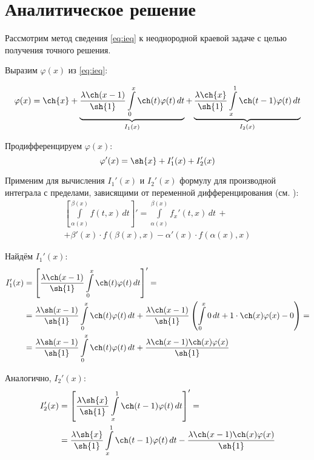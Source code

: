 \documentclass{article}
\numberwithin{equation}{section}
\renewcommand{\phi}{\varphi}
\newcommand{\intl}{\int\limits}
\begin{document}
\clearpage
\section{Аналитическое решение}
\label{sec:anal-solution}

Рассмотрим метод сведения \eqref{eq:ieq} к неоднородной краевой задаче
с целью получения точного решения.

Выразим $\phi(x)$ из \eqref{eq:ieq}:

\begin{equation}
  \label{eq:phi}
  \phi(x) = \ch{x} + 
  \underbrace{\frac{\lambda \ch(x-1)}{\sh{1}}\intl_0^x{\ch(t) \phi(t)\,dt}}_{I_1(x)} +
  \underbrace{\frac{\lambda \ch{x}}{\sh{1}}\intl_x^1{\ch(t-1)\phi(t)\,dt}}_{I_2(x)}
\end{equation}

Продифференцируем $\phi(x)$:
\begin{equation*}
  \phi'(x) = \sh{x} + I_1'(x) + I_2'(x)
\end{equation*}

Применим для вычисления $I_1'(x)$ и $I_2'(x)$ формулу для производной
интеграла с пределами, зависящими от переменной дифференцирования (см.
\cite{fikhtengolz03}):
\begin{multline}\label{eq:intdiff}
  \left [ \intl_{\alpha(x)}^{\beta(x)}{f(t, x)\,dt} \right ] ' = 
  \intl_{\alpha(x)}^{\beta(x)}{{f_x}'(t, x)\,dt}\, + \\
  + \beta'(x)\cdot f(\beta(x), x) -
  \alpha'(x)\cdot f(\alpha(x), x)
\end{multline}

Найдём $I_1'(x)$:
\begin{align*}
  I_1'(x) &= \left[ \frac{\lambda \ch(x-1)}{\sh{1}}\intl_0^x{\ch(t) \phi(t)\,dt} \right] ' = \\
  &= \frac{\lambda \sh(x-1)}{\sh{1}}\intl_0^x{\ch(t)\phi(t)\,dt} +
  \frac{\lambda \ch(x-1)}{\sh{1}} \left ( \intl_0^x{0\,dt} +
    1 \cdot \ch(x) \phi(x) - 0 \right) = \\
  &= \frac{\lambda \sh(x-1)}{\sh{1}}\intl_0^x{\ch(t)\phi(t)\,dt} +
  \frac{\lambda \ch(x-1) \ch(x) \phi(x)}{\sh{1}}    
\end{align*}

Аналогично, $I_2'(x)$:
\begin{align*}
  I_2'(x) &= \left[\frac{\lambda \sh{x}}{\sh{1}}\intl_x^1{\ch(t-1)\phi(t)\,dt} \right] ' = \\
  &= \frac{\lambda \sh{x}}{\sh{1}}\intl_x^1{\ch(t-1)\phi(t)\,dt} -
  \frac{\lambda \ch(x-1) \ch(x) \phi(x)}{\sh{1}}
\end{align*}
\end{document}
